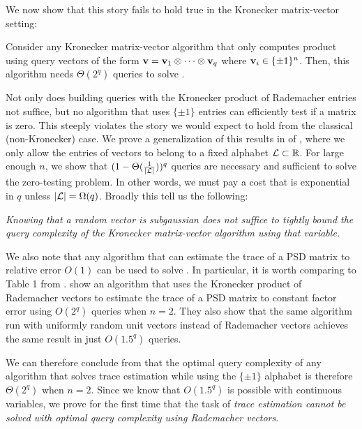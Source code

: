 We now show that this story fails to hold true in the Kronecker matrix-vector setting:
\begin{theorem}
	\label{thm:zero-testing-rademacher}
	Consider any Kronecker matrix-vector algorithm that only computes product using query vectors of the form \(\boldsymbol{\mathrm{v}} = \boldsymbol{\mathrm{v}}_1 \otimes \cdots \otimes \boldsymbol{\mathrm{v}}_q\) where \(\boldsymbol{\mathrm{v}}_i\in\{\pm1\}^n\).
	Then, this algorithm needs \(\Theta(2^q)\) queries to solve .
\end{theorem}
Not only does building queries with the Kronecker product of Rademacher entries not suffice, but no algorithm that uses \(\{\pm1\}\) entries can efficiently test if a matrix is zero.
This steeply violates the story we would expect to hold from the classical (non-Kronecker) case.
We prove a generalization of this results in  of , where we only allow the entries of vectors to belong to a fixed alphabet \({\mathcal L}\subset{\mathbb R}\).
For large enough \(n\), we show that \((1 - \Theta(\frac{1}{|{\mathcal L}|}))^q\) queries are necessary and sufficient to solve the zero-testing problem.
In other words, we must pay a cost that is exponential in \(q\) unless \(|{\mathcal L}| = \Omega(q)\).
Broadly this tell us the following:

\begin{center}
	\emph{Knowing that a random vector is subgaussian does not suffice to tightly bound the query complexity of the Kronecker matrix-vector algorithm using that variable.}
\end{center}

We also note that any algorithm that can estimate the trace of a PSD matrix to relative error \(O(1)\) can be used to solve .
In particular, it is worth comparing  to Table 1 from \cite{meyer2023hutchinson}.
\cite{meyer2023hutchinson} show an algorithm that uses the Kronecker product of Rademacher vectors to estimate the trace of a PSD matrix to constant factor error using \(O(2^q)\) queries when \(n=2\).
They also show that the same algorithm run with uniformly random unit vectors instead of Rademacher vectors achieves the same result in just \(O(1.5^q)\) queries.

We can therefore conclude from  that the optimal query complexity of any algorithm that solves trace estimation while using the \(\{\pm1\}\) alphabet is therefore \(\Theta(2^q)\) when \(n=2\).
Since we know that \(O(1.5^q)\) is possible with continuous variables, we prove for the first time that the task of \emph{trace estimation cannot be solved with optimal query complexity using Rademacher vectors}.

